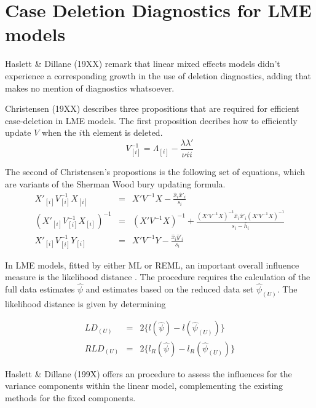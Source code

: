 \documentclass[Main.tex]{subfiles}
\begin{document}
	
	\section{Case Deletion Diagnostics for LME models}
	
	
	Haslett \& Dillane (19XX) remark that linear mixed effects models
didn't experience a corresponding growth in the use of deletion
diagnostics, adding that \citet{McCullSearle} makes no mention of
diagnostics whatsoever.


Christensen (19XX)  describes three propositions that are required
for efficient case-deletion in LME models. The first proposition
decribes how to efficiently update $V$ when the $i$th element is
deleted.
\begin{equation}
V_{[i]}^{-1} = \Lambda_{[i]} - \frac{\lambda
	\lambda\prime}{\nu^{}ii}
\end{equation}


The second of Christensen's propostions is the following set of
equations, which are variants of the Sherman Wood bury updating
formula.
\begin{eqnarray}
X'_{[i]}V_{[i]}^{-1}X_{[i]} &=& X' V^{-1}X -
\frac{\hat{x}_{i}\hat{x}'_{i}}{s_{i}}\\
(X'_{[i]}V_{[i]}^{-1}X_{[i]})^{-1} &=& (X' V^{-1}X)^{-1} +
\frac{(X' V^{-1}X)^{-1}\hat{x}_{i}\hat{x}' _{i}
	(X' V^{-1}X)^{-1}}{s_{i}- \bar{h}_{i}}\\
X'_{[i]}V_{[i]}^{-1}Y_{[i]} &=& X\prime V^{-1}Y -
\frac{\hat{x}_{i}\hat{y}' _{i}}{s_{i}}
\end{eqnarray}








In LME models, fitted by either ML or REML, an important overall
influence measure is the likelihood distance \citep{cook82}. The
procedure requires the calculation of the full data estimates
$\hat{\psi}$ and estimates based on the reduced data set
$\hat{\psi}_{(U)}$. The likelihood distance is given by
determining


\begin{eqnarray}
LD_{(U)} &=& 2\{l(\hat{\psi}) - l( \hat{\psi}_{(U)}) \}\\
RLD_{(U)} &=& 2\{l_{R}(\hat{\psi}) - l_{R}(\hat{\psi}_{(U)})\}
\end{eqnarray}


Haslett \& Dillane (199X) offers an
procedure to assess the influences for the variance components
within the linear model, complementing the existing methods for
the fixed components. 
\end{document}
